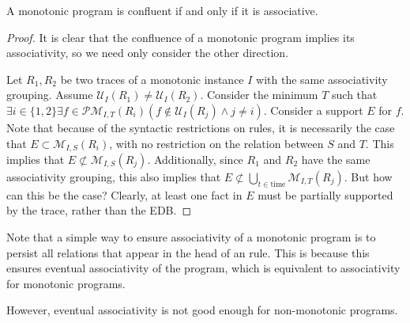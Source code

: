 \begin{lemma}
%
A monotonic \lang program is confluent if and only if it is associative.
%
\end{lemma}
%
\begin{proof}
%
It is clear that the confluence of a monotonic \lang program implies its
associativity, so we need only consider the other direction.

Let $R_1, R_2$ be two traces of a monotonic \lang instance $I$ with the same
associativity grouping.  Assume $\mathcal{U}_{I}(R_1) \neq
\mathcal{U}_{I}(R_2)$. Consider the minimum $T$ such that $\exists i \in
\{1,2\} \exists f \in \mathcal{PM}_{I,T}(R_i) (f \not\in \mathcal{U}_{I}(R_j)
\land j\neq i)$.  Consider a
support $E$ for $f$.  Note that because of the syntactic restrictions on \lang
rules, it is necessarily the case that $E \subset \mathcal{M}_{I,S}(R_i)$, with
no restriction on the relation between $S$ and $T$.  This implies that $E 
\not\subset \mathcal{M}_{I,S}(R_j)$.  Additionally, since $R_1$ and $R_2$ have
the same associativity grouping, this also implies that $E \not\subset 
\bigcup_{t \in \text{time}} \mathcal{M}_{I,T}(R_j)$.  But how can this be the
case?  Clearly, at least one fact in $E$ must be partially supported by the
trace, rather than the EDB.  
%
\end{proof}

Note that a simple way to ensure associativity of a monotonic program is to
persist all relations that appear in the head of an  rule.
This is because this ensures eventual associativity of the program, which is
equivalent to associativity for monotonic programs.

However, eventual associativity is not good enough for non-monotonic programs.


